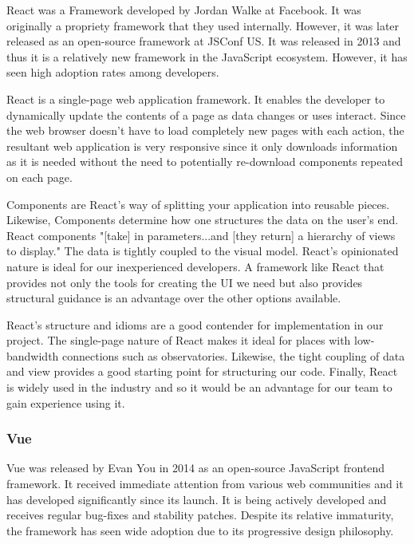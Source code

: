 \documentclass[12pt]{report}
\begin{document}
React was a Framework developed by Jordan Walke at Facebook. It was originally a propriety framework that they used internally. However, it was later released as an open-source framework at JSConf US.\cite{reactlaunch} It was released in 2013 and thus it is a relatively new framework in the JavaScript ecosystem.\cite{reactlaunch} However, it has seen high adoption rates among developers.

React is a single-page web application framework. It enables the developer to dynamically update the contents of a page as data changes or uses interact. Since the web browser doesn't have to load completely new pages with each action, the resultant web application is very responsive since it only downloads information as it is needed without the need to potentially re-download components repeated on each page.

Components are React's way of splitting your application into reusable pieces. Likewise, Components determine how one structures the data on the user's end. React components "[take] in parameters...and [they return] a hierarchy of views to display."\cite{reacttutorial} The data is tightly coupled to the visual model. React's opinionated nature is ideal for our inexperienced developers. A framework like React that provides not only the tools for creating the UI we need but also provides structural guidance is an advantage over the other options available.

React's structure and idioms are a good contender for implementation in our project. The single-page nature of React makes it ideal for places with low-bandwidth connections such as observatories. Likewise, the tight coupling of data and view provides a good starting point for structuring our code. Finally, React is widely used in the industry and so it would be an advantage for our team to gain experience using it.

\subsubsection*{Vue}

Vue was released by Evan You in 2014 as an open-source JavaScript frontend framework.\cite{vuelaunch} It received immediate attention from various web communities and it has developed significantly since its launch. It is being actively developed and receives regular bug-fixes and stability patches. Despite its relative immaturity, the framework has seen wide adoption due to its progressive design philosophy.
\end{document}
